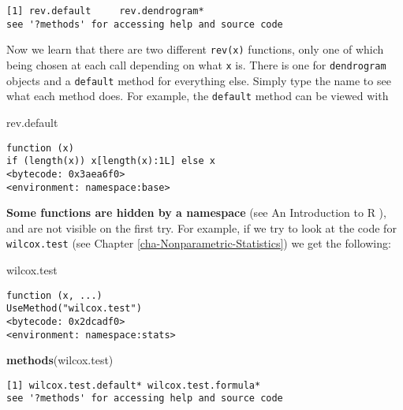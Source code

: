 \documentclass[]{book}
\newenvironment{Shaded}{\begin{snugshade}}{\end{snugshade}}
\newcommand{\KeywordTok}[1]{\textcolor[rgb]{0.13,0.29,0.53}{\textbf{{#1}}}}
\newcommand{\NormalTok}[1]{{#1}}
\numberwithin{equation}{chapter}
\numberwithin{figure}{chapter}
\theoremstyle{plain}
\theoremstyle{definition}
\theoremstyle{remark}
\theoremstyle{definition}
\theoremstyle{definition}
\theoremstyle{remark}
\begin{document}
\begin{verbatim}
[1] rev.default     rev.dendrogram*
see '?methods' for accessing help and source code
\end{verbatim}

Now we learn that there are two different \texttt{rev(x)} functions,
only one of which being chosen at each call depending on what \texttt{x}
is. There is one for \texttt{dendrogram} objects and a \texttt{default}
method for everything else. Simply type the name to see what each method
does. For example, the \texttt{default} method can be viewed with

\begin{Shaded}
\begin{Highlighting}[]
\NormalTok{rev.default}
\end{Highlighting}
\end{Shaded}

\begin{verbatim}
function (x) 
if (length(x)) x[length(x):1L] else x
<bytecode: 0x3aea6f0>
<environment: namespace:base>
\end{verbatim}

\textbf{Some functions are hidden by a namespace} (see An Introduction
to R \textcite{Venables2010}), and are not visible on the first try. For
example, if we try to look at the code for \texttt{wilcox.test}
 (see Chapter
\ref{cha-Nonparametric-Statistics}) we get the following:

\begin{Shaded}
\begin{Highlighting}[]
\NormalTok{wilcox.test}
\end{Highlighting}
\end{Shaded}

\begin{verbatim}
function (x, ...) 
UseMethod("wilcox.test")
<bytecode: 0x2dcadf0>
<environment: namespace:stats>
\end{verbatim}

\begin{Shaded}
\begin{Highlighting}[]
\KeywordTok{methods}\NormalTok{(wilcox.test)}
\end{Highlighting}
\end{Shaded}

\begin{verbatim}
[1] wilcox.test.default* wilcox.test.formula*
see '?methods' for accessing help and source code
\end{verbatim}
\end{document}
